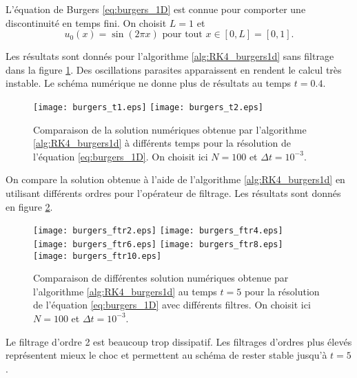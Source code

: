 L'équation de Burgers \eqref{eq:burgers_1D} est connue pour comporter une discontinuité en temps fini. On choisit $L=1$ et
\begin{equation}
u_0(x) = \sin ( 2 \pi x) \text{ pour tout } x \in [0,L]=[0,1].
\end{equation}

Les résultats sont donnés pour l'algorithme \ref{alg:RK4_burgers1d} sans filtrage dans la figure \ref{fig:comp_burgers}. Des oscillations parasites apparaissent en rendent le calcul très instable. Le schéma numérique ne donne plus de résultats au temps $t=0.4$.
\begin{figure}[htbp]
\begin{center}
\texttt{[image: burgers\_t1.eps]}
\texttt{[image: burgers\_t2.eps]}
\end{center}
\caption{Comparaison de la solution numériques obtenue par l'algorithme \ref{alg:RK4_burgers1d} à différents temps pour la résolution de l'équation \eqref{eq:burgers_1D}. On choisit ici $N=100$ et $\Delta t = 10^{-3}$.}
\label{fig:comp_burgers}
\end{figure}

On compare la solution obtenue à l'aide de l'algorithme \ref{alg:RK4_burgers1d} en utilisant différents ordres pour l'opérateur de filtrage. Les résultats sont donnés en figure \ref{fig:comp_burgers_ftr}.
\begin{figure}[htbp]
\begin{center}
\texttt{[image: burgers\_ftr2.eps]}
\texttt{[image: burgers\_ftr4.eps]}\\
\texttt{[image: burgers\_ftr6.eps]}
\texttt{[image: burgers\_ftr8.eps]}\\
\texttt{[image: burgers\_ftr10.eps]}
\end{center}
\caption{Comparaison de différentes solution numériques obtenue par l'algorithme \ref{alg:RK4_burgers1d} au temps $t=5$ pour la résolution de l'équation \eqref{eq:burgers_1D} avec différents filtres. On choisit ici $N=100$ et $\Delta t = 10^{-3}$.}
\label{fig:comp_burgers_ftr}
\end{figure}
Le filtrage d'ordre 2 est beaucoup trop dissipatif. Les filtrages d'ordres plus élevés représentent mieux le choc et permettent au schéma de rester stable jusqu'à $t=5$.

















